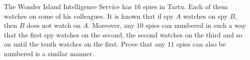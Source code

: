 The Wonder Island Intelligence Service has $16$ spies in Tartu. Each of them watches on some of his colleagues. It is known that if spy $A$ watches on spy $B$,  then $B$ does not watch on $A$. Moreover, any $10$ spies can numbered in such a way that the first spy watches on the second, the second watches on the third and so on until the tenth watches on the first. Prove that any $11$ spies can also be numbered is a similar manner.